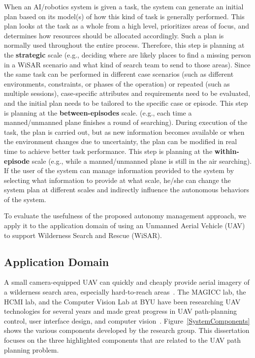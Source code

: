 When an AI/robotics system is given a task, the system can generate an initial plan based on its model(s) of how this kind of task is generally performed. This plan looks at the task as a whole from a high level, prioritizes areas of focus, and determines how resources should be allocated accordingly. Such a plan is normally used throughout the entire process. Therefore, this step is planning at the \textbf{strategic} scale (e.g., deciding where are likely places to find a missing person in a WiSAR scenario and what kind of search team to send to those areas). Since the same task can be performed in different case scenarios (such as different environments, constraints, or phases of the operation) or repeated (such as multiple sessions), case-specific attributes and requirements need to be evaluated, and the initial plan needs to be tailored to the specific case or episode. This step is planning at the \textbf{between-episodes} scale. (e.g., each time a manned/unmanned plane finishes a round of searching). During execution of the task, the plan is carried out, but as new information becomes available or when the environment changes due to uncertainty, the plan can be modified in real time to achieve better task performance. This step is planning at the \textbf{within-episode} scale (e.g., while a manned/unmanned plane is still in the air searching). If the user of the system can manage information provided to the system by selecting what information to provide at what scale, he/she can change the system plan at different scales and indirectly influence the autonomous behaviors of the system.

To evaluate the usefulness of the proposed autonomy management approach, we apply it to the application domain of using an Unmanned Aerial Vehicle (UAV) to support Wilderness Search and Rescue (WiSAR).

\subsection{Application Domain}

A small camera-equipped UAV can quickly and cheaply provide aerial imagery of a wilderness search area, especially hard-to-reach areas~\cite{Goodrich2008Supporting}. The MAGICC lab, the HCMI lab, and the Computer Vision Lab at BYU have been researching UAV technologies for several years and made great progress in UAV path-planning control, user interface design, and computer vision~\cite{Lin2010Supporting}. Figure~\ref{SystemComponents} shows the various components developed by the research group. This dissertation focuses on the three highlighted components that are related to the UAV path planning problem.

